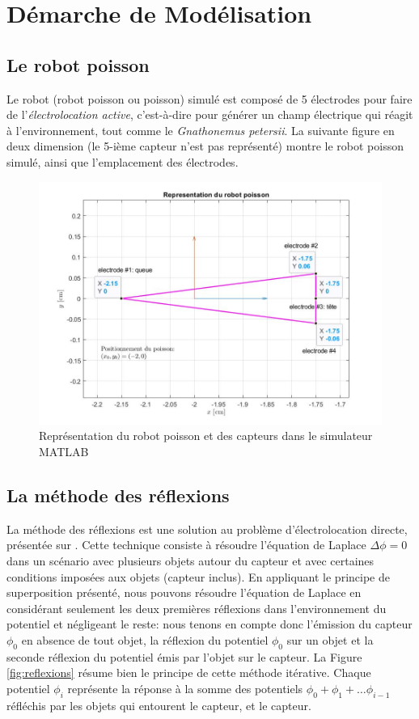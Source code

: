 \section{Démarche de Modélisation}
\subsection{Le robot poisson}

Le robot (robot poisson ou poisson) simulé est composé de 5 électrodes pour faire de l'\textit{électrolocation active}, c'est-à-dire pour générer un champ électrique qui réagit à l'environnement, tout comme le \textit{Gnathonemus petersii}. La suivante figure en deux dimension (le 5-ième capteur n'est pas représenté) montre le robot poisson simulé, ainsi que l'emplacement des électrodes. 

\begin{figure}[h!]
    \centering
    \includegraphics[width=\textwidth]{assets/poisson/poisson.jpg}
    \caption{Représentation du robot poisson et des capteurs dans le simulateur MATLAB}
    \label{fig:poisson}
\end{figure}

\subsection{La méthode des réflexions}
La méthode des réflexions est une solution au problème d'électrolocation directe, présentée sur \cite{Boyer2012}. Cette technique consiste à résoudre l'équation de Laplace $\Delta\phi = 0$ dans un scénario avec plusieurs objets autour du capteur et avec certaines conditions imposées aux objets (capteur inclus). En appliquant le principe de superposition présenté, nous pouvons résoudre l'équation de Laplace en considérant seulement les deux premières réflexions dans l'environnement du potentiel et négligeant le reste: nous tenons en compte donc l'émission du capteur $\phi_0$ en absence de tout objet, la réflexion du potentiel $\phi_0$ sur un objet et la seconde réflexion du potentiel émis par l'objet sur le capteur. La Figure \ref{fig:reflexions} résume bien le principe de cette méthode itérative. Chaque potentiel $\phi_i$ représente la réponse à la somme des potentiels $\phi_0 + \phi_1 + \dots \phi_{i-1}$ réfléchis par les objets qui entourent le capteur, et le capteur. 

